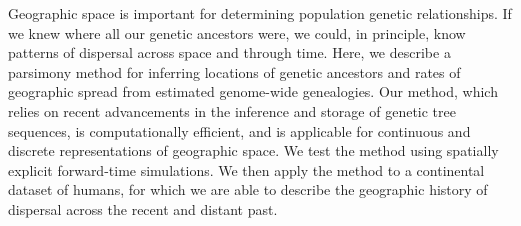 Geographic space is important for determining population genetic relationships.
If we knew where all our genetic ancestors were, we could, in principle, know 
patterns of dispersal across space and through time. Here, we describe a 
parsimony method for inferring locations of genetic ancestors and rates of 
geographic spread from estimated genome-wide genealogies. Our method, which 
relies on recent advancements in the inference and storage of genetic tree 
sequences, is computationally efficient, and is applicable for continuous and 
discrete representations of geographic space. We test the method using 
spatially explicit forward-time simulations.  We then apply the method to a 
continental dataset of humans, for which we are able to describe the geographic 
history of dispersal across the recent and distant past.
